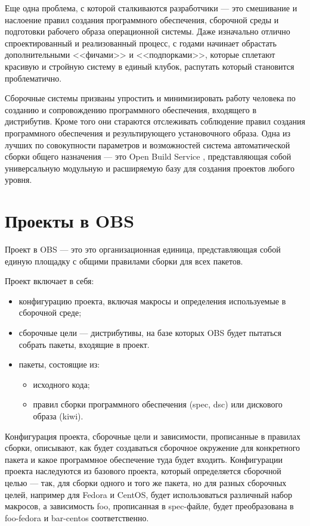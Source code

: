 \documentclass[10pt, a5paper]{article}
\begin{document}
Еще одна проблема, с которой сталкиваются разработчики --- это смешивание и наслоение правил создания программного обеспечения, сборочной среды и подготовки рабочего образа операционной системы. Даже изначально отлично спроектированный и реализованный процесс, с годами начинает обрастать дополнительными <<фичами>> и <<подпорками>>, которые сплетают красивую и стройную систему в единый клубок, распутать который становится проблематично.

Сборочные системы призваны упростить и минимизировать работу человека по созданию и сопровождению программного обеспечения, входящего в дистрибутив. Кроме того они стараются отслеживать соблюдение правил создания программного обеспечения и результирующего установочного образа. Одна из лучших по совокупности параметров и возможностей система автоматической сборки общего назначения --- это Open Build Service \cite{Pynkin1}, представляющая собой универсальную модульную и расширяемую базу для создания проектов любого уровня.

\section*{Проекты в OBS}

Проект в OBS --- это  это организационная единица, представляющая собой единую площадку с общими правилами сборки для всех пакетов.

Проект включает в себя:

\begin{itemize}
  \item конфигурацию проекта, включая макросы и определения используемые в сборочной среде;
  \item сборочные цели --- дистрибутивы, на базе которых OBS будет пытаться собрать пакеты,  входящие в проект.
  \item пакеты, состоящие из:
	  \begin{itemize}
		  \item исходного кода;
		  \item правил сборки программного обеспечения (spec, dsc) или дискового образа (kiwi).
	  \end{itemize}
\end{itemize}

Конфигурация проекта, сборочные цели и зависимости, прописанные в правилах сборки, описывают, как будет создаваться сборочное окружение для конкретного пакета и какое программное обеспечение туда будет входить.
Конфигурации проекта наследуются из базового проекта, который определяется сборочной целью --- так,  для сборки одного и того же пакета, но для разных сборочных целей, например для Fedora и CentOS, будет использоваться различный набор макросов, а зависимость foo, прописанная в spec-файле, будет преобразована в foo-fedora и bar-centos соответственно.
\end{document}
